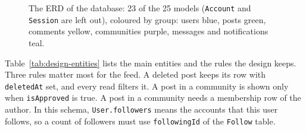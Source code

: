 \begin{figure}[p]
  \centering
  \caption{The ERD of the database: 23 of the 25 models (\texttt{Account} and \texttt{Session} are left out), coloured by group: users blue, posts green, comments yellow, communities purple, messages and notifications teal.}
  \label{fig:design-erd}
\end{figure}

Table~\ref{tab:design-entities} lists the main entities and the rules the design keeps. Three rules matter most for the feed. A deleted post keeps its row with \texttt{deletedAt} set, and every read filters it. A post in a community is shown only when \texttt{isApproved} is true. A post in a community needs a membership row of the author. In this schema, \texttt{User.followers} means the accounts that this user follows, so a count of followers must use \texttt{followingId} of the \texttt{Follow} table.

